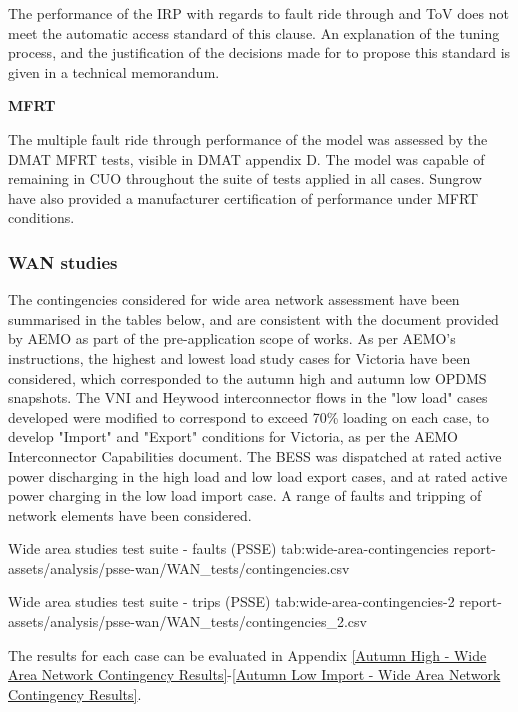 \documentclass{../grid-link-report}
\begin{document}
			The performance of the \ac{IRP} with regards to fault ride through and ToV does not meet the automatic access standard of this clause. An explanation of the tuning process, and the justification of the decisions made for to propose this standard is given in a technical memorandum. \cite{fault-performance-memo}
			
			\textbf{MFRT}
			
			The multiple fault ride through performance of the model was assessed by the DMAT MFRT tests, visible in DMAT appendix D. The model was capable of remaining in \ac{CUO} throughout the suite of tests applied in all cases. Sungrow have also provided a manufacturer certification of performance under MFRT conditions. \cite{sungrow-mfrt}


		\subsubsection{WAN studies}

		The contingencies considered for wide area network assessment have been summarised in the tables below, and are consistent with the document provided by AEMO as part of the pre-application scope of works. \cite{wan-contingency-list} As per AEMO's instructions, the highest and lowest load study cases for Victoria have been considered, which corresponded to the autumn high and autumn low OPDMS snapshots. The VNI and Heywood interconnector flows in the "low load" cases developed were modified to correspond to exceed 70\% loading on each case, to develop "Import" and "Export" conditions for Victoria, as per the AEMO Interconnector Capabilities document. \cite{aemo-interconnector-advice}  The BESS was dispatched at rated active power discharging in the high load and low load export cases, and at rated active power charging in the low load import case. A range of faults and tripping of network elements have been considered.
		
		{
			\fontsize{5}{7}\selectfont
			\autoscaledlongtable
				{Wide area studies test suite - faults (PSSE)}
				{tab:wide-area-contingencies}
				{report-assets/analysis/psse-wan/WAN_tests/contingencies.csv}
		}
		
		{
			\fontsize{9}{7}\selectfont
			\autoscaledlongtable
			{Wide area studies test suite - trips (PSSE)}
			{tab:wide-area-contingencies-2}
			{report-assets/analysis/psse-wan/WAN_tests/contingencies_2.csv}
		}
		
		The results for each case can be evaluated in Appendix \ref{Autumn High - Wide Area Network Contingency Results}-\ref{Autumn Low Import - Wide Area Network Contingency Results}.
		
\end{document}
